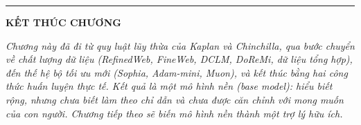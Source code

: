 \bigskip
\hrule
\bigskip

\begin{center}
    \textbf{\Large KẾT THÚC CHƯƠNG \thechapter}
\end{center}

\textit{Chương này đã đi từ quy luật lũy thừa của Kaplan và Chinchilla, qua bước chuyển về chất lượng dữ liệu (RefinedWeb, FineWeb, DCLM, DoReMi, dữ liệu tổng hợp), đến thế hệ bộ tối ưu mới (Sophia, Adam-mini, Muon), và kết thúc bằng hai công thức huấn luyện thực tế. Kết quả là một \emph{mô hình nền (base model)}: hiểu biết rộng, nhưng chưa biết làm theo chỉ dẫn và chưa được căn chỉnh với mong muốn của con người. Chương tiếp theo sẽ biến mô hình nền thành một trợ lý hữu ích.}
